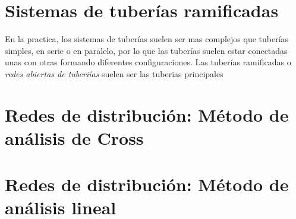 \documentclass[10pt, oneside]{article}
\begin{document}
\section{Sistemas de tuber\'ias ramificadas} 
En la practica, los sistemas de tuber\'ias suelen ser mas complejos que tuber\'ias simples, en serie o en paralelo, por lo que las tuber\'ias suelen estar conectadas unas con otras formando diferentes configuraciones. Las tuber\'ias ramificadas o \emph{redes abiertas de tuberi\'ias} suelen ser las tuberias principales 

\section{Redes de distribuci\'on: M\'etodo de an\'alisis de Cross}

\section{Redes de distribuci\'on: M\'etodo de an\'alisis lineal}




\end{document}
